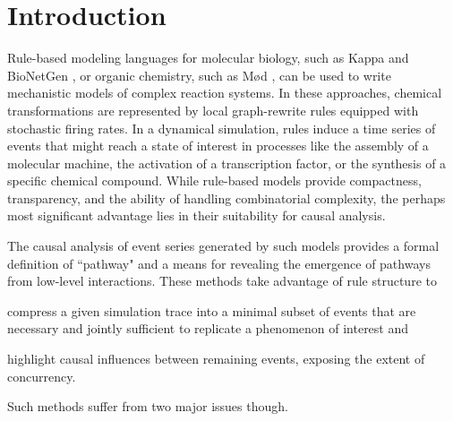 
\section*{Introduction}\label{sec:intro}


Rule-based modeling languages for molecular biology, such as Kappa
\cite{DanosEtAl-CONCUR07} and BioNetGen \cite{bngl}, or organic
chemistry, such as M{\o}d \cite{moll}, can be used to write
mechanistic models of complex reaction systems. In these approaches,
chemical transformations are represented by local graph-rewrite rules
equipped with stochastic firing rates. In a dynamical simulation,
rules induce a time series of events that might reach a state of
interest in processes like the assembly of a molecular machine, the
activation of a transcription factor, or the synthesis of a specific
chemical compound. While rule-based models provide compactness,
transparency, and the ability of handling combinatorial complexity,
the perhaps most significant advantage lies in their suitability for
causal analysis.

% 

The causal analysis
\cite{DBLP:conf/fsttcs/DanosFFHH12,DanosEtAl-CONCUR07} of event series
generated by such models provides a formal definition of ``pathway"
and a means for revealing the emergence of pathways from low-level
interactions. These methods take advantage of rule structure to
\begin{inparaenum}[(i)]
\item \label{step:compress} compress a given simulation trace into a
  minimal subset of events that are necessary and jointly sufficient
  to replicate a phenomenon of interest and
\item \label{step:highlight} highlight causal influences between
  remaining events, exposing the extent of concurrency.
\end{inparaenum}
Such methods suffer from two major issues though. 

